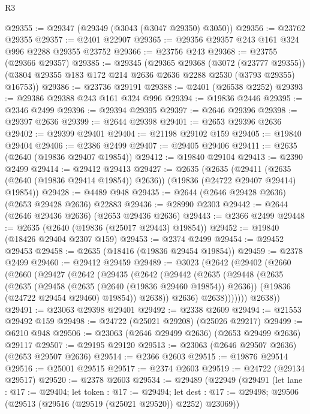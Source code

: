 \begin{lexlean}{R3}
\begin{coremodule}
@29355 := @29347 (@29349 (@3043 (@3047 @29350) @3050))
@29356 := @23762 @29355
@29357 := @2401 @22907
@29365 := @29356 @29357 @243 @161 @324 @996 @2288 @29355 @23752
@29366 := @23756 @243
@29368 := @23755 (@29366 @29357)
@29385 := @29345
    (@29365
      @29368
      (@3072 (@23777 @29355))
      (@3804 @29355 @183 @172 @214 @2636 @2636 @2288 @2530 (@3793 @29355) @16753))
@29386 := @23736 @29191
@29388 := @2401 (@26538 @2252)
@29393 := @29386 @29388 @243 @161 @324 @996
@29394 := @19836 @2446
@29395 := @2346 @2499
@29396 := @29394 @29395
@29397 := @2646 @29396
@29398 := @29397 @2636
@29399 := @2644 @29398
@29401 := @2653 @29396 @2636
@29402 := @29399 @29401
@29404 := @21198 @29102 @159
@29405 := @19840 @29404
@29406 := @2386 @2499
@29407 := @29405 @29406
@29411 := @2635 (@2640 (@19836 @29407 @19854))
@29412 := @19840 @29104
@29413 := @2390 @2499
@29414 := @29412 @29413
@29427 := @2635
    (@2635
      (@29411 (@2635 (@2640 (@19836 @29414 @19854)) @2636))
      (@19836 (@24722 @29407 @29414) @19854))
@29428 := @4489 @948
@29435 := @2644 (@2646 @29428 @2636) (@2653 @29428 @2636) @22883
@29436 := @28990 @2303
@29442 := @2644 (@2646 @29436 @2636) (@2653 @29436 @2636)
@29443 := @2366 @2499
@29448 := @2635 (@2640 (@19836 (@25017 @29443) @19854))
@29452 := @19840 (@18426 @29404 @2307 @159)
@29453 := @2374 @2499
@29454 := @29452 @29453
@29458 := @2635 (@18416 (@19836 @29454 @19854))
@29459 := @2378 @2499
@29460 := @29412 @29459
@29489 := @3023
    (@2642
      (@29402
        (@2660
          (@2660
            (@29427
              (@2642
                (@29435
                  (@2642
                    (@29442
                      (@2635
                        (@29448
                          (@2635
                            (@2635
                              (@29458 (@2635 (@2640 (@19836 @29460 @19854)) @2636))
                              (@19836 (@24722 @29454 @29460) @19854))
                            @2638))
                        @2636)
                      @2638)))))))
        @2638))
@29491 := @23063 @29398 @29401
@29492 := @2338 @2609
@29494 := @21553 @29492 @159
@29498 := @24722 (@25021 @29208) (@25026 @29217)
@29499 := @6210 @948
@29506 := @23063 (@2646 @29499 @2636) (@2653 @29499 @2636) @29117
@29507 := @29195 @29120
@29513 := @23063 (@2646 @29507 @2636) (@2653 @29507 @2636)
@29514 := @2366 @2603
@29515 := @19876 @29514
@29516 := @25001 @29515
@29517 := @2374 @2603
@29519 := @24722 (@29134 @29517)
@29520 := @2378 @2603
@29534 := @29489
    (@22949
      (@29491
        (let lane : @17 := @29404;
        let token : @17 := @29494;
        let dest : @17 := @29498; @29506 (@29513 (@29516 (@29519 (@25021 @29520)) @2252) @23069))

\end{coremodule}
\end{lexlean}
